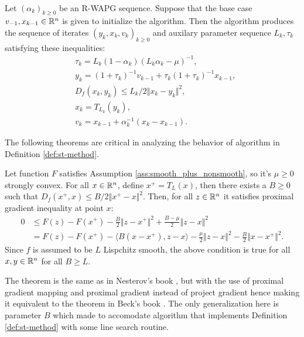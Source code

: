 \documentclass[12pt]{article}
\begin{document}
        \begin{definition}\;\label{def:st-method}\\
            Let $(\alpha_k)_{k \ge 0}$ be an R-WAPG sequence. 
            Suppose that the base case $v_{-1}, x_{k - 1}\in \mathbb R^n$ is given to initialize the algorithm. 
            Then the algorithm produces the sequence of iterates $(y_k, x_k, v_k)_{k \ge 0}$ and auxilary parameter sequence $L_k, \tau_k$ satisfying these inequalities: 
            \begin{align*}
                & \tau_k = L_k(1 - \alpha_k)(L_k\alpha_k - \mu)^{-1}, 
                \\
                & y_k = (1 + \tau_k)^{-1} v_{k - 1} + \tau_k (1 + \tau_k)^{-1} x_{k - 1},
                \\
                & D_f(x_k, y_k) \le L_k/2\Vert x_k - y_k\Vert^2, 
                \\
                & x_k = T_{L_k}(y_k),
                \\
                & v_k = x_{k - 1} + \alpha_k^{-1}(x_k - x_{k - 1}). 
            \end{align*} 
        \end{definition}
        The following theorems are critical in analyzing the behavior of algorithm in Definition \ref{def:st-method}. 
        \begin{theorem}\label{thm:pg-ineq}
            Let function $F$ satisfies Assumption \ref{ass:smooth_plus_nonsmooth}, so it's $\mu \ge 0$ strongly convex. 
            For all $x\in \mathbb R^n$, define $x^+ = T_L(x)$, then there exists a $B \ge 0$ such that $D_f(x^+, x) \le B/2 \Vert x^+ - x\Vert^2$. 
            Then, for all $z \in \mathbb R^n$ it satisfies proximal gradient inequality at point $x$:  
            \begin{align*}
                0&\le F(z) - F(x^+) - \frac{B}{2}\Vert z - x^+\Vert^2  + \frac{B - \mu}{2}\Vert z - x\Vert^2
                \\
                &=  F(z) - F(x^+) - \langle B(x - x^+), z - x\rangle
                - \frac{\mu}{2}\Vert z - x\Vert^2
                - \frac{B}{2}\Vert x - x^+\Vert^2. 
            \end{align*}
            Since $f$ is assumed to be $L$ Lispchitz smooth, the above condition is true for all $x, y \in \mathbb R^n$ for all $B \ge L$. 
        \end{theorem}
        \begin{remark}
            The theorem is the same as in Nesterov's book \cite[Theorem 2.2.13]{nesterov_lectures_2018}, but with the use of proximal gradient mapping and proximal gradient instead of project gradient hence making it equivalent to the theorem in Beck's book \cite[Theorem 10.16]{beck_first-order_2017}. 
            The only generalization here is parameter $B$ which made to accomodate algorithm that implements Definition \ref{def:st-method} with some line search routine. 
        \end{remark}
\end{document}

